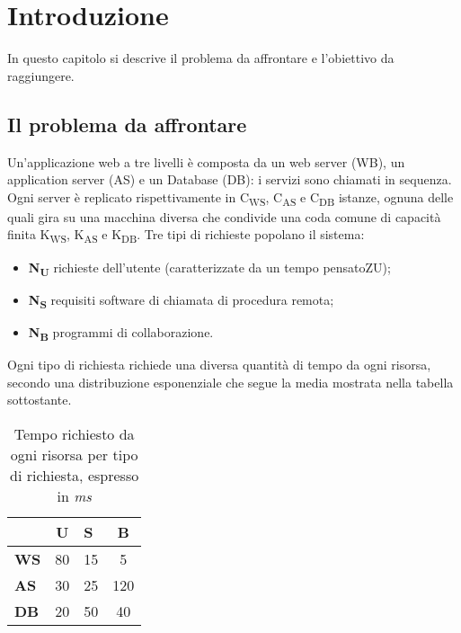 \documentclass[../main.tex]{subfiles}
\begin{document}
    \chapter{Introduzione}\label{ch:introduzione}
    In questo capitolo si descrive il problema da affrontare e l'obiettivo da raggiungere.


    \section{Il problema da affrontare}\label{sec:Il-problema-da-affrontare}
    Un'applicazione web a tre livelli è composta da un web server (WB), un application server (AS) e un Database (DB): i servizi sono chiamati in sequenza.
    Ogni server è replicato rispettivamente in C\textsubscript{WS}, C\textsubscript{AS} e C\textsubscript{DB} istanze, ognuna delle quali gira su una macchina diversa che condivide una coda comune di capacità finita K\textsubscript{WS}, K\textsubscript{AS} e K\textsubscript{DB}.
    \newline Tre tipi di richieste popolano il sistema:
    \begin{itemize}
        \item \textbf{N\textsubscript{U}} richieste dell'utente (caratterizzate da un tempo pensatoZU);
        \item \textbf{N\textsubscript{S}} requisiti software di chiamata di procedura remota;
        \item \textbf{N\textsubscript{B}} programmi di collaborazione.
    \end{itemize}
    Ogni tipo di richiesta richiede una diversa quantità di tempo da ogni risorsa, secondo una distribuzione esponenziale che segue la media mostrata nella tabella sottostante.
    \begin{table}[h]
        \centering
        \begin{tabular}{|l|c|l|c|}
            \hline
            & \textbf{U} & \textbf{S} & \textbf{B} \\ [0.5ex]
            \hline
            \textbf{WS} & 80         & 15         & 5          \\
            \textbf{AS} & 30         & 25         & 120        \\
            \textbf{DB} & 20         & 50         & 40         \\
            \hline
        \end{tabular}
        \caption{Tempo richiesto da ogni risorsa per tipo di richiesta, espresso in \textit{ms}}
        \label{tab:tempo-richiesto-da-ogni-risorsa-per-tipo-di-richiesta}
    \end{table}
\end{document}
